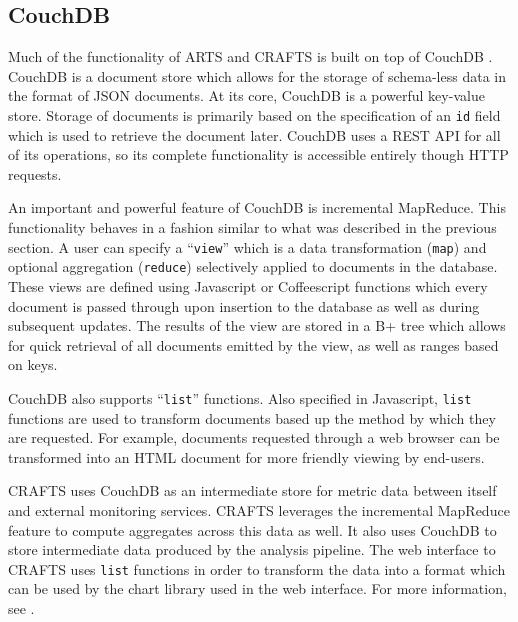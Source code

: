 \subsection{CouchDB}
Much of the functionality of ARTS and CRAFTS is built on top of CouchDB \cite{couch}. CouchDB is a document store which allows for the storage of schema-less data in the format of JSON documents. At its core, CouchDB is a powerful key-value store. Storage of documents is primarily based on the specification of an \texttt{id} field which is used to retrieve the document later. CouchDB uses a REST API for all of its operations, so its complete functionality is accessible entirely though HTTP requests.

An important and powerful feature of CouchDB is incremental MapReduce. This functionality behaves in a fashion similar to what was described in the previous section. A user can specify a ``\texttt{view}'' which is a data transformation (\texttt{map}) and optional aggregation (\texttt{reduce}) selectively applied to documents in the database. These views are defined using Javascript or Coffeescript functions which every document is passed through upon insertion to the database as well as during subsequent updates. The results of the view are stored in a B+ tree which allows for quick retrieval of all documents emitted by the view, as well as ranges based on keys.

CouchDB also supports ``\texttt{list}'' functions. Also specified in Javascript, \texttt{list} functions are used to transform documents based up the method by which they are requested. For example, documents requested through a web browser can be transformed into an HTML document for more friendly viewing by end-users.

CRAFTS uses CouchDB as an intermediate store for metric data between itself and external monitoring services. CRAFTS leverages the incremental MapReduce feature to compute aggregates across this data as well. It also uses CouchDB to store intermediate data produced by the analysis pipeline. The web interface to CRAFTS uses \texttt{list} functions in order to transform the data into a format which can be used by the chart library used in the web interface. For more information, see .
